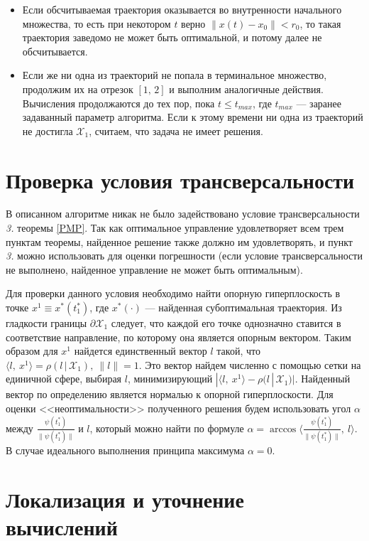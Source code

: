 \documentclass[11pt]{article}
\newcommand\X{\mathcal{X}}
\newcommand\Sup[2]{\rho( #1 \, | \, #2 )}
\DeclareMathOperator{\Arccos}{arccos}
\begin{document}
\begin{itemize}
\item Если обсчитываемая траектория оказывается во внутренности начального множества, то есть при некотором
$t$ верно $\|x(t) - x_0\| < r_0$, то такая траектория заведомо не может быть оптимальной, и потому далее не
обсчитывается.
 
\item Если же ни одна из траекторий не попала в терминальное множество, продолжим их на отрезок
$[1, \, 2]$ и выполним аналогичные действия. Вычисления продолжаются до тех пор, пока $t \le t_{max}$,
где $t_{max}$ --- заранее задаванный параметр алгоритма. Если к этому времени ни одна из траекторий
не достигла $\X_1$, считаем, что задача не имеет решения.

\end{itemize}

\section{Проверка условия трансверсальности}
В описанном алгоритме никак не было задействовано условие трансверсальности \textit{3.} теоремы 
\ref{PMP}. Так как оптимальное управление удовлетворяет всем трем пунктам теоремы, найденное
решение также должно им удовлетворять, и пункт \textit{3.} можно использовать для оценки
погрешности (если условие трансверсальности не выполнено, найденное управление не может быть
оптимальным).

Для проверки данного условия необходимо найти опорную гиперплоскость в точке $x^1 \equiv x^*(t_1^*)$, 
где $x^*(\cdot)$ --- найденная субоптимальная траектория. Из гладкости границы $\partial \X_1$ 
следует, что
каждой его точке однозначно ставится в соответствие направление, по которому она
является опорным вектором. Таким образом для $x^1$
найдется единственный вектор $l$ такой, что $\langle l, \ x^1 \rangle = \Sup{l}{\X_1}, \ \|l\| = 1$.
Это вектор найдем численно с помощью сетки на единичной сфере, выбирая $l$, минимизирующий
 $|\langle l, \ x^1 \rangle - \Sup{l}{\X_1}|$. Найденный вектор по определению является нормалью
 к опорной гиперплоскости. Для оценки <<неоптимальности>> полученного решения
 будем использовать угол $\alpha$ между $\frac{\psi(t_1^*)}{\|\psi(t_1^*)\|}$ и $l$, который можно
  найти по формуле $\alpha = \Arccos \langle \frac{\psi(t_1^*)}{\|\psi(t_1^*)\|}, \ l \rangle$.
  В случае идеального выполнения принципа максимума $\alpha = 0$.


\section{Локализация и уточнение вычислений}
\end{document}
